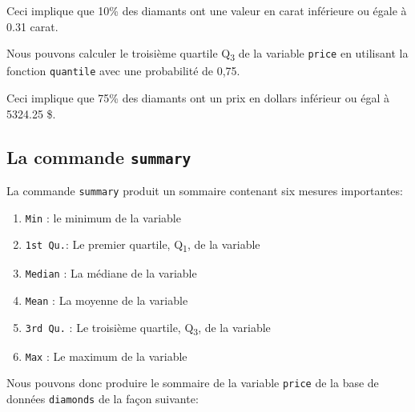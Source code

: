 \documentclass[]{book}
\newenvironment{Shaded}{\begin{snugshade}}{\end{snugshade}}
\newcommand{\FloatTok}[1]{\textcolor[rgb]{0.00,0.00,0.81}{#1}}
\newcommand{\KeywordTok}[1]{\textcolor[rgb]{0.13,0.29,0.53}{\textbf{#1}}}
\newcommand{\NormalTok}[1]{#1}
\newcommand{\OperatorTok}[1]{\textcolor[rgb]{0.81,0.36,0.00}{\textbf{#1}}}
\providecommand{\tightlist}{%
  \setlength{\itemsep}{0pt}\setlength{\parskip}{0pt}}
\theoremstyle{definition}
\theoremstyle{definition}
\theoremstyle{definition}
\theoremstyle{remark}
\begin{document}
Ceci implique que 10\% des diamants ont une valeur en carat inférieure
ou égale à 0.31 carat.

Nous pouvons calculer le troisième quartile Q\textsubscript{3} de la
variable \texttt{price} en utilisant la fonction \texttt{quantile} avec
une probabilité de 0,75.

\begin{Shaded}
\end{Shaded}

Ceci implique que 75\% des diamants ont un prix en dollars inférieur ou
égal à 5324.25 \$.

\hypertarget{la-commande-summary}{%
\subsection{\texorpdfstring{La commande
\texttt{summary}}{La commande summary}}\label{la-commande-summary}}

La commande \texttt{summary} produit un sommaire contenant six mesures
importantes:

\begin{enumerate}
\def\labelenumi{\arabic{enumi}.}
\tightlist
\item
  \texttt{Min} : le minimum de la variable
\item
  \texttt{1st\ Qu.}: Le premier quartile, Q\textsubscript{1}, de la
  variable
\item
  \texttt{Median} : La médiane de la variable
\item
  \texttt{Mean} : La moyenne de la variable
\item
  \texttt{3rd\ Qu.} : Le troisième quartile, Q\textsubscript{3}, de la
  variable
\item
  \texttt{Max} : Le maximum de la variable
\end{enumerate}

Nous pouvons donc produire le sommaire de la variable \texttt{price} de
la base de données \texttt{diamonds} de la façon suivante:

\begin{Shaded}
\end{Shaded}
\end{document}
